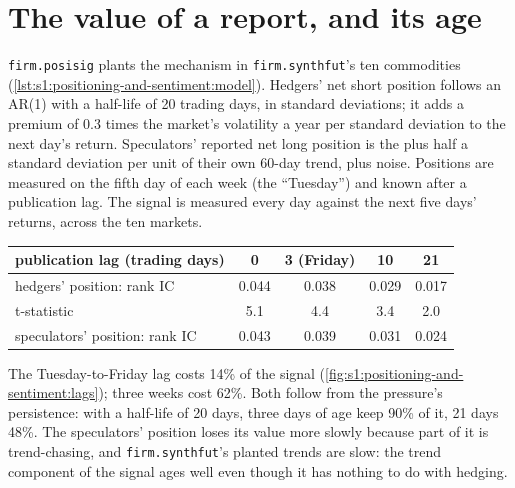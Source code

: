 \section{The value of a report, and its age}

\texttt{firm.posisig} plants the mechanism in \texttt{firm.synthfut}'s ten commodities (\cref{lst:s1:positioning-and-sentiment:model}). Hedgers' net
short position follows an AR(1) with a half-life of 20 trading days, in standard deviations; it adds a premium of 0.3 times the market's volatility a
year per standard deviation to the next day's return. Speculators' reported net long position is the  plus half a standard deviation
per unit of their own 60-day trend, plus noise. Positions are measured on the fifth day of each week (the ``Tuesday'') and known after a publication
lag. The signal is measured every day against the next five days' returns, across the ten markets.

\begin{center}
\small
\begin{tabular}{@{}lcccc@{}}
\toprule
publication lag (trading days) & 0 & 3 (Friday) & 10 & 21\\
\midrule
hedgers' position: rank IC & 0.044 & 0.038 & 0.029 & 0.017\\
\quad t-statistic & 5.1 & 4.4 & 3.4 & 2.0\\
speculators' position: rank IC & 0.043 & 0.039 & 0.031 & 0.024\\
\bottomrule
\end{tabular}
\end{center}

The Tuesday-to-Friday lag costs 14\% of the signal (\cref{fig:s1:positioning-and-sentiment:lags}); three weeks cost 62\%. Both follow from the
pressure's persistence: with a half-life of 20 days, three days of age keep 90\% of it, 21 days 48\%. The speculators' position loses its value more
slowly because part of it is trend-chasing, and \texttt{firm.synthfut}'s planted trends are slow: the trend component of the signal ages well even
though it has nothing to do with hedging.

